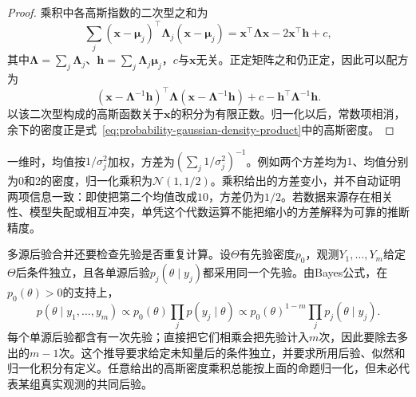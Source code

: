 \begin{proof}
乘积中各高斯指数的二次型之和为
\[
 \sum_j(\bm x-\bm\mu_j)^\top\bm\Lambda_j(\bm x-\bm\mu_j)
 =\bm x^\top\bm\Lambda\bm x-2\bm x^\top\bm h+c,
\]
其中\(\bm\Lambda=\sum_j\bm\Lambda_j\)、\(\bm h=\sum_j\bm\Lambda_j\bm\mu_j\)，\(c\)与\(\bm x\)无关。正定矩阵之和仍正定，因此可以配方为
\[
 (\bm x-\bm\Lambda^{-1}\bm h)^\top\bm\Lambda
 (\bm x-\bm\Lambda^{-1}\bm h)+c-\bm h^\top\bm\Lambda^{-1}\bm h.
\]
以该二次型构成的高斯函数关于\(\bm x\)的积分为有限正数。归一化以后，常数项相消，余下的密度正是式~\eqref{eq:probability-gaussian-density-product}中的高斯密度。
\end{proof}

一维时，均值按\(1/\sigma_j^2\)加权，方差为\((\sum_j1/\sigma_j^2)^{-1}\)。例如两个方差均为\(1\)、均值分别为\(0\)和\(2\)的密度，归一化乘积为\(\mathcal N(1,1/2)\)。乘积给出的方差变小，并不自动证明两项信息一致：即使把第二个均值改成\(10\)，方差仍为\(1/2\)。若数据来源存在相关性、模型失配或相互冲突，单凭这个代数运算不能把缩小的方差解释为可靠的推断精度。

多源后验合并还要检查先验是否重复计算。设\(\Theta\)有先验密度\(p_0\)，观测\(Y_1,\ldots,Y_m\)给定\(\Theta\)后条件独立，且各单源后验\(p_j(\theta\mid y_j)\)都采用同一个先验。由Bayes公式，在\(p_0(\theta)>0\)的支持上，
\begin{equation}
 p(\theta\mid y_1,\ldots,y_m)
 \propto p_0(\theta)\prod_jp(y_j\mid\theta)
 \propto p_0(\theta)^{1-m}\prod_jp_j(\theta\mid y_j).
 \label{eq:probability-common-prior-posterior-fusion}
\end{equation}
每个单源后验都含有一次先验；直接把它们相乘会把先验计入\(m\)次，因此要除去多出的\(m-1\)次。这个推导要求给定未知量后的条件独立，并要求所用后验、似然和归一化积分有定义。任意给出的高斯密度乘积总能按上面的命题归一化，但未必代表某组真实观测的共同后验。


